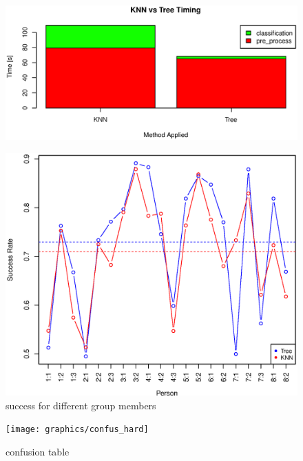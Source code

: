 \begin{figure}[H]
\centering
\includegraphics[width=\textwidth]{graphics/algo_compare_timing}
\end{figure}


\begin{figure}[H]
\centering
\includegraphics[width=\textwidth]{graphics/success_comp_hard}
\caption{success for different group members}
\end{figure}

\begin{figure}[H]
\centering
\texttt{[image: graphics/confus\_hard]}
\caption{confusion table}
\end{figure}


